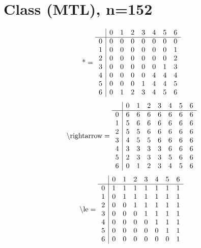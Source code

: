 \documentclass[11pt]{article}
\begin{document}
\section{Class (MTL), n=152}
\[\text{*} = 
\begin{array}{r | r r r r r r r}
 & 0 & 1 & 2 & 3 & 4 & 5 & 6 \\ \hline
0 & 0 & 0 & 0 & 0 & 0 & 0 & 0 \\
1 & 0 & 0 & 0 & 0 & 0 & 0 & 1 \\
2 & 0 & 0 & 0 & 0 & 0 & 0 & 2 \\
3 & 0 & 0 & 0 & 0 & 0 & 1 & 3 \\
4 & 0 & 0 & 0 & 0 & 4 & 4 & 4 \\
5 & 0 & 0 & 0 & 1 & 4 & 4 & 5 \\
6 & 0 & 1 & 2 & 3 & 4 & 5 & 6 \\
\end{array}
\]
\[\text{\textbackslash rightarrow} = 
\begin{array}{r | r r r r r r r}
 & 0 & 1 & 2 & 3 & 4 & 5 & 6 \\ \hline
0 & 6 & 6 & 6 & 6 & 6 & 6 & 6 \\
1 & 5 & 6 & 6 & 6 & 6 & 6 & 6 \\
2 & 5 & 5 & 6 & 6 & 6 & 6 & 6 \\
3 & 4 & 5 & 5 & 6 & 6 & 6 & 6 \\
4 & 3 & 3 & 3 & 3 & 6 & 6 & 6 \\
5 & 2 & 3 & 3 & 3 & 5 & 6 & 6 \\
6 & 0 & 1 & 2 & 3 & 4 & 5 & 6 \\
\end{array}
\]
\[\text{\textbackslash le} = 
\begin{array}{r | r r r r r r r}
 & 0 & 1 & 2 & 3 & 4 & 5 & 6 \\ \hline
0 & 1 & 1 & 1 & 1 & 1 & 1 & 1 \\
1 & 0 & 1 & 1 & 1 & 1 & 1 & 1 \\
2 & 0 & 0 & 1 & 1 & 1 & 1 & 1 \\
3 & 0 & 0 & 0 & 1 & 1 & 1 & 1 \\
4 & 0 & 0 & 0 & 0 & 1 & 1 & 1 \\
5 & 0 & 0 & 0 & 0 & 0 & 1 & 1 \\
6 & 0 & 0 & 0 & 0 & 0 & 0 & 1 \\
\end{array}
\]
\end{document}
